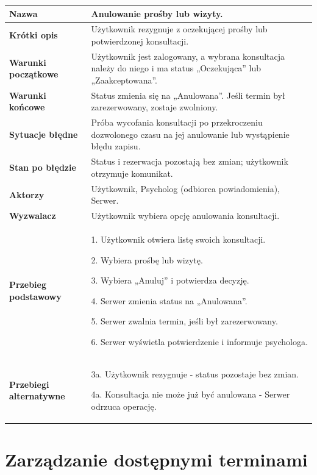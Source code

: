 \documentclass[11pt,a4paper]{article}
\renewcommand{\arraystretch}{1.3}
\newcommand{\pole}[2]{
\textbf{#1} & #2 \\ \hline
}
\begin{document}
\begin{tabularx}{\textwidth}{|p{3.9cm}|Y|}
\hline

\pole{Nazwa}{
Anulowanie prośby lub wizyty.
}

\pole{Krótki opis}{
Użytkownik rezygnuje z oczekującej
prośby lub potwierdzonej konsultacji.
}

\pole{Warunki początkowe}{
Użytkownik jest zalogowany,
a wybrana konsultacja należy do niego
i ma status „Oczekująca” lub „Zaakceptowana”.
}

\pole{Warunki końcowe}{
Status zmienia się na „Anulowana”.
Jeśli termin był zarezerwowany,
zostaje zwolniony.
}

\pole{Sytuacje błędne}{
Próba wycofania konsultacji po przekroczeniu dozwolonego czasu na jej anulowanie lub wystąpienie błędu zapisu.
}

\pole{Stan po błędzie}{
Status i rezerwacja pozostają bez zmian;
użytkownik otrzymuje komunikat.
}

\pole{Aktorzy}{
Użytkownik,
Psycholog (odbiorca powiadomienia),
Serwer.
}

\pole{Wyzwalacz}{
Użytkownik wybiera opcję
anulowania konsultacji.
}

\pole{Przebieg podstawowy}{
1. Użytkownik otwiera listę swoich konsultacji.\par
2. Wybiera prośbę lub wizytę.\par
3. Wybiera „Anuluj” i potwierdza decyzję.\par
4. Serwer zmienia status na „Anulowana”.\par
5. Serwer zwalnia termin,
jeśli był zarezerwowany.\par
6. Serwer wyświetla potwierdzenie i informuje psychologa.
}

\pole{Przebiegi alternatywne}{
3a. Użytkownik rezygnuje -
status pozostaje bez zmian.\par
4a. Konsultacja nie może już być anulowana -
Serwer odrzuca operację.
}

\end{tabularx}
\endgroup

\clearpage

\section*{Zarządzanie dostępnymi terminami}

\begingroup
\small
\renewcommand{\arraystretch}{1.14}
\end{document}
